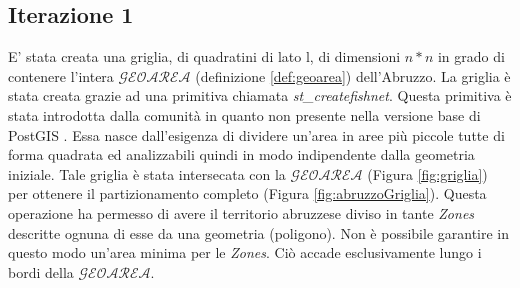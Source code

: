 \subsection{\textbf{Iterazione 1}}
E' stata creata una griglia, di quadratini di lato l, di dimensioni $n*n$ in grado di contenere l'intera  $\mathcal{GEOAREA}$ (definizione \ref{def:geoarea}) dell'Abruzzo. La griglia è stata creata grazie ad una primitiva chiamata \textit{st\_createfishnet}. Questa primitiva è stata introdotta dalla comunità in quanto non presente nella versione base di PostGIS \cite{fishnet}. Essa nasce dall'esigenza di dividere un'area in aree più piccole tutte di forma quadrata ed analizzabili quindi in modo indipendente dalla geometria iniziale. Tale griglia è stata intersecata con la  $\mathcal{GEOAREA}$ (Figura \ref{fig:griglia}) per ottenere il partizionamento completo (Figura \ref{fig:abruzzoGriglia}). Questa operazione ha permesso di avere il territorio abruzzese diviso in tante \textit{Zones} descritte ognuna di esse da una geometria (poligono). Non è possibile garantire in questo modo un'area minima per le \textit{Zones}. Ciò accade esclusivamente lungo i bordi della 
$\mathcal{GEOAREA}$. 
